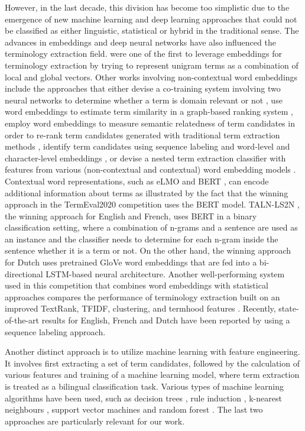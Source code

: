 However, in the last decade, this division has become too simplistic due to the emergence of new machine learning and deep learning approaches that could not be classified as either linguistic, statistical or hybrid in the traditional sense. The advances in embeddings and deep neural networks have also influenced the terminology extraction field. \cite{amjadian2016local} were one of the first to leverage embeddings for terminology extraction by trying to represent unigram terms as a combination of local and global vectors. Other works involving non-contextual word embeddings include the approaches that either devise a co-training system involving two neural networks to determine whether a term is domain relevant or not \citep{wang2016featureless}, use word embeddings to estimate term similarity in a graph-based ranking system \citep{khan2016term},  employ word embeddings to measure semantic relatedness of term candidates in order to re-rank term candidates generated with traditional term extraction methods \citep{zhang2017semre},  identify term candidates using sequence labeling and word-level and character-level embeddings \citep{kucza2018term}, or devise a nested term extraction classifier with features from various (non-contextual and contextual) word embedding models \citep{gao2019feature}. Contextual word representations, such as eLMO \citep{peters-etal-2018-deep} and BERT \citep{devlin2018bert}, can encode additional information about terms as illustrated by the fact that the winning approach in the TermEval2020 competition \citep{rigouts2020termeval} uses the BERT model. TALN-LS2N \citep{hazem2020termeval}, the winning approach for English and French, uses BERT in a binary classification setting, where a combination of n-grams and a sentence are used as an instance and the classifier needs to determine for each n-gram inside the sentence whether it is a term or not. On the other hand, the winning approach for Dutch \citep{rigouts2020termeval} uses pretrained GloVe word embeddings that are fed into a bi-directional LSTM-based neural architecture. Another well-performing system used in this competition that combines word embeddings with statistical approaches compares the performance of terminology extraction built on an improved TextRank, TFIDF, clustering, and termhood features \citep{puais2020termeval}. Recently, state-of-the-art results for English, French and Dutch have been reported by \cite{lang2021transforming} using a sequence labeling approach.

Another distinct approach is to utilize machine learning with feature engineering. It involves first extracting a set of term candidates, followed by the calculation of various features and training of a machine learning model, where term extraction is treated as a bilingual classification task. Various types of machine learning algorithms have been used, such as decision trees \citep{karan2012evaluation}, rule induction \citep{foo2010using}, k-nearest neighbours \citep{qasemizadeh2014evaluation}, support vector machines \citep{ljubevsic2019kas} and random forest \citep{rigouts2021hamlet}. The last two approaches are particularly relevant for our work. 

